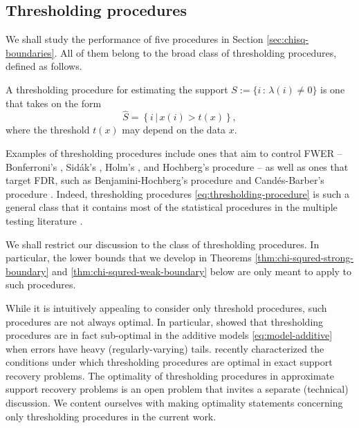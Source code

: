 \subsection{Thresholding procedures}
\label{subsec:thresholding-procedures}

We shall study the performance of five procedures in Section \ref{sec:chisq-boundaries}.
All of them belong to the broad class of thresholding procedures, defined as follows.
\begin{definition}
A thresholding procedure for estimating the support 
$S:=\{i\, :\, \lambda(i)\neq0\}$ is one that takes on the form
\begin{equation} \label{eq:thresholding-procedure}
    \widehat{S} = \left\{i\,|\,x(i) > t(x)\right\},
\end{equation}
where the threshold $t(x)$ may depend on the data $x$.
\end{definition}
Examples of thresholding procedures include ones that aim to control FWER -- Bonferroni's \cite{dunn1961multiple}, Sid\'ak's \citep{vsidak1967rectangular}, Holm's \citep{holm1979simple}, and Hochberg's procedure \citep{hochberg1988sharper} -- as well as ones that target FDR, such as Benjamini-Hochberg's procedure \cite{benjamini1995controlling} and Cand\'es-Barber's procedure \cite{barber2015controlling}.
Indeed, thresholding procedures \eqref{eq:thresholding-procedure} is such a general class that it contains most of the statistical procedures in the multiple testing literature \cite{roquain2011type}.

We shall restrict our discussion to the class of thresholding procedures.
In particular, the lower bounds that we develop in Theorems \ref{thm:chi-squred-strong-boundary} and \ref{thm:chi-squred-weak-boundary} below are only meant to apply to such procedures.

\begin{remark}
While it is intuitively appealing to consider only threshold procedures, such procedures are not always optimal.
In particular, \citet{chen2018scan} showed that thresholding procedures are in fact sub-optimal in the additive models \eqref{eq:model-additive} when errors have heavy (regularly-varying) tails. 
\citet{gao2018fundamental} recently characterized the conditions under which thresholding procedures are optimal in exact support recovery problems.
The optimality of thresholding procedures in approximate support recovery problems is an open problem that invites a separate (technical) discussion. 
We content ourselves with making optimality statements concerning only thresholding procedures in the current work.
\end{remark}


